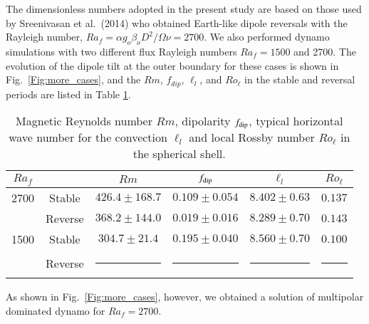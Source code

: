 {\color{teal}
The dimensionless numbers adopted in the present study are based on those used by Sreenivasan et al.\ (2014) who obtained Earth-like dipole reversals with the Rayleigh number, $Ra_f = \alpha g_o \beta_o D^2 / \Omega \nu = 2700$.
}
{\color{red} We also performed dynamo simulations with two different flux Rayleigh numbers $Ra_{f} = 1500$ and 2700. The evolution of the dipole tilt at the outer boundary for these cases is shown in Fig.~\ref{Fig:more_cases}, and the $Rm$, $f_{dip}$, $\ell_{l}$, and $Ro_{\ell}$ in the stable and reversal periods are listed in Table \ref{table:average_dipolarity_2}.
}

\begin{table}[t]
\caption{Magnetic Reynolds number $Rm$, dipolarity $f_{\rm dip}$, 
{\color{blue} typical horizontal wave number for the convection $\ell_{l}$}
and local Rossby number $Ro_{\ell}$ in the spherical shell.}
\label{table:average_dipolarity_2}
\renewcommand{\arraystretch}{1.3} %
\begin{tabular}{cc|cccc}
$Ra_f$ & & $Rm$ & $f_{\rm dip}$ & 
  ${\ell}_{l}$ & $Ro_{\ell}$ \\ \hline
2700 & \mbox{Stable} & $426.4 \pm 168.7 $ &
                $0.109 \pm 0.054$ &
                $8.402 \pm 0.63$ & 
                $0.137$ \\
& \mbox{Reverse} & $368.2 \pm 144.0 $ &
                 $0.019 \pm 0.016$ &
                 $8.289 \pm 0.70$ & 
                 $0.143$\\ \hline
1500 & \mbox{Stable} & $304.7 \pm 21.4 $ &
                $0.195 \pm 0.040$ &
                $8.560 \pm 0.70$ & 
                $0.100$ \\
& \mbox{Reverse} &  \rule[0.5ex]{2em}{0.4pt} &
                  \rule[0.5ex]{2em}{0.4pt} &
                  \rule[0.5ex]{2em}{0.4pt} & 
                  \rule[0.5ex]{2em}{0.4pt} \\ \hline\end{tabular}
\end{table}
%
As shown in Fig.~\ref{Fig:more_cases}, however, we obtained a solution of multipolar dominated dynamo for $Ra_f = 2700$.
